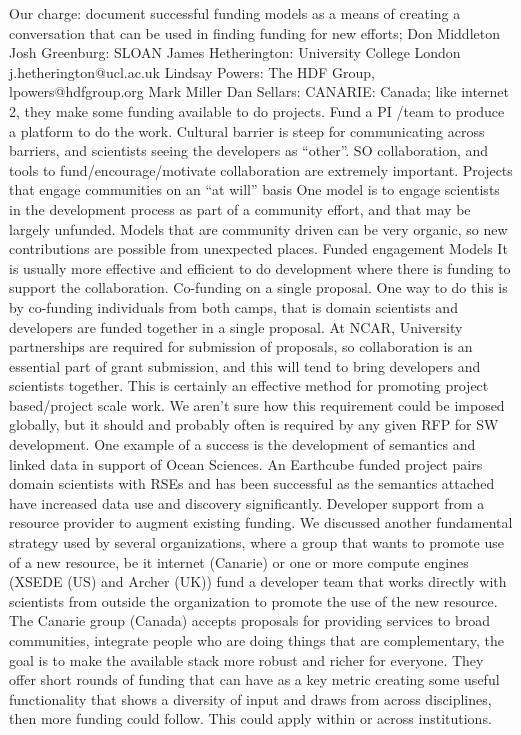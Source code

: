 Our charge: document successful funding models as a means of creating a conversation that can be used in finding funding for new efforts;
Don Middleton
Josh Greenburg: SLOAN
James Hetherington: University College London j.hetherington@ucl.ac.uk
Lindsay Powers: The HDF Group, lpowers@hdfgroup.org
Mark Miller
Dan Sellars: CANARIE: Canada; like internet 2, they make some funding available to do projects.
Fund a PI /team to produce a platform to do the work.
Cultural barrier is steep for communicating across barriers, and scientists seeing the developers as “other”. SO collaboration, and tools to fund/encourage/motivate collaboration are extremely important.
Projects that engage communities on an “at will” basis
One model is to engage scientists in the development process as part of a community effort, and that may be largely unfunded. Models that are community driven can be very organic, so new contributions are possible from unexpected places.  
Funded engagement Models
It is usually more effective and efficient to do development where there is funding to support the collaboration. 
Co-funding on a single proposal.
One way to do this is by co-funding individuals from both camps, that is domain scientists and developers are funded together in a single proposal. At NCAR, University partnerships are required for submission of proposals, so collaboration is an essential part of grant submission, and this will tend to bring developers and scientists together. This is certainly an effective method for promoting project based/project scale work. We aren’t sure how this requirement could be imposed globally, but it should and probably often is required by any given RFP for SW development. One example of a success is the development of semantics and linked data in support of Ocean Sciences. An Earthcube funded project pairs domain scientists with RSEs and has been successful as the semantics attached have increased data use and discovery significantly.
Developer support from a resource provider to augment existing funding.
We discussed another fundamental strategy used by several organizations, where a group that wants to promote use of a new resource, be it internet (Canarie) or one or more compute engines (XSEDE (US) and Archer (UK)) fund a developer team that works directly with scientists from outside the organization to promote the use of the new resource.
The Canarie group (Canada) accepts proposals for providing services to broad communities, integrate people who are doing things that are complementary, the goal is to make the available stack more robust and richer for everyone. They offer short rounds of funding that can have as a key metric creating some useful functionality that shows a diversity of input and draws from across disciplines, then more funding could follow. This could apply within or across institutions.

